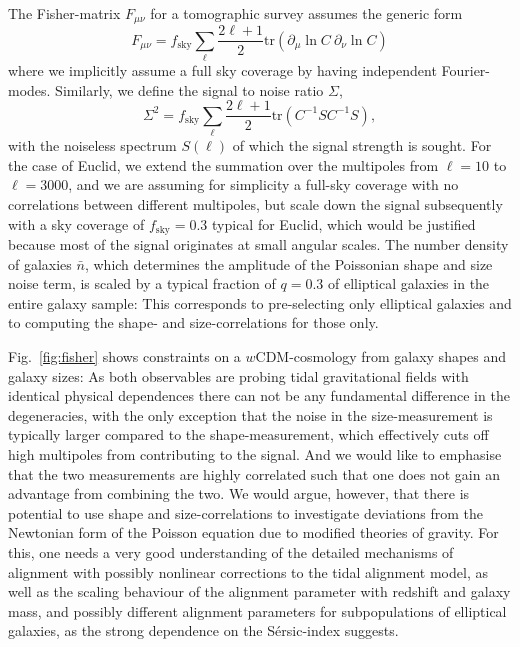 \documentclass[a4paper,fleqn,usenatbib]{mnras}
\begin{document}
The Fisher-matrix $F_{\mu\nu}$ for a tomographic survey assumes the generic form
\begin{equation}
F_{\mu\nu} = f_\mathrm{sky}\sum_\ell\frac{2\ell+1}{2}\mathrm{tr}\left(\partial_\mu\ln C\:\partial_\nu\ln C\right)
\end{equation}
where we implicitly assume a full sky coverage by having independent Fourier-modes. Similarly, we define the signal to noise ratio $\Sigma$,
\begin{equation}
\Sigma^2 = f_\mathrm{sky}\sum_\ell\frac{2\ell+1}{2}\mathrm{tr}\left(C^{-1}SC^{-1}S\right),
\end{equation}
with the noiseless spectrum $S(\ell)$ of which the signal strength is sought. For the case of Euclid, we extend the summation over the multipoles from $\ell=10$ to $\ell=3000$, and we are assuming for simplicity a full-sky coverage with no correlations between different multipoles, but scale down the signal subsequently with a sky coverage of $f_\mathrm{sky}=0.3$ typical for Euclid, which would be justified because most of the signal originates at small angular scales. The number density of galaxies $\bar{n}$, which determines the amplitude of the Poissonian shape and size noise term, is scaled by a typical fraction of $q=0.3$ of elliptical galaxies in the entire galaxy sample: This corresponds to pre-selecting only elliptical galaxies and to computing the shape- and size-correlations for those only. 

Fig.~\ref{fig:fisher} shows constraints on a $w$CDM-cosmology from galaxy shapes and galaxy sizes: As both observables are probing tidal gravitational fields with identical physical dependences there can not be any fundamental difference in the degeneracies, with the only exception that the noise in the size-measurement is typically larger compared to the shape-measurement, which effectively cuts off high multipoles from contributing to the signal. And we would like to emphasise that the two measurements are highly correlated such that one does not gain an advantage from combining the two. We would argue, however, that there is potential to use shape and size-correlations to investigate deviations from the Newtonian form of the Poisson equation due to modified theories of gravity. For this, one needs a very good understanding of the detailed mechanisms of alignment with possibly nonlinear corrections to the tidal alignment model, as well as the scaling behaviour of the alignment parameter with redshift and galaxy mass, and possibly different alignment parameters for subpopulations of elliptical galaxies, as the strong dependence on the S{\'e}rsic-index suggests.
\end{document}
